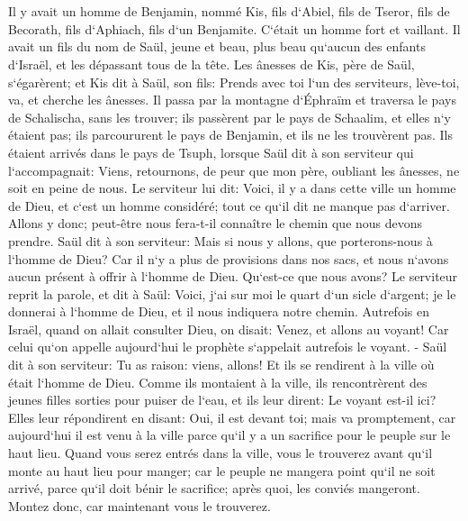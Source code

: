 \chapter{}

\verse Il y avait un homme de Benjamin, nommé Kis, fils d`Abiel, fils de Tseror, fils de Becorath, fils d`Aphiach, fils d`un Benjamite. C`était un homme fort et vaillant. 
\verse Il avait un fils du nom de Saül, jeune et beau, plus beau qu`aucun des enfants d`Israël, et les dépassant tous de la tête. 
\verse Les ânesses de Kis, père de Saül, s`égarèrent; et Kis dit à Saül, son fils: Prends avec toi l`un des serviteurs, lève-toi, va, et cherche les ânesses. 
\verse Il passa par la montagne d`Éphraïm et traversa le pays de Schalischa, sans les trouver; ils passèrent par le pays de Schaalim, et elles n`y étaient pas; ils parcoururent le pays de Benjamin, et ils ne les trouvèrent pas. 
\verse Ils étaient arrivés dans le pays de Tsuph, lorsque Saül dit à son serviteur qui l`accompagnait: Viens, retournons, de peur que mon père, oubliant les ânesses, ne soit en peine de nous. 
\verse Le serviteur lui dit: Voici, il y a dans cette ville un homme de Dieu, et c`est un homme considéré; tout ce qu`il dit ne manque pas d`arriver. Allons y donc; peut-être nous fera-t-il connaître le chemin que nous devons prendre. 
\verse Saül dit à son serviteur: Mais si nous y allons, que porterons-nous à l`homme de Dieu? Car il n`y a plus de provisions dans nos sacs, et nous n`avons aucun présent à offrir à l`homme de Dieu. Qu`est-ce que nous avons? 
\verse Le serviteur reprit la parole, et dit à Saül: Voici, j`ai sur moi le quart d`un sicle d`argent; je le donnerai à l`homme de Dieu, et il nous indiquera notre chemin. 
\verse Autrefois en Israël, quand on allait consulter Dieu, on disait: Venez, et allons au voyant! Car celui qu`on appelle aujourd`hui le prophète s`appelait autrefois le voyant. - 
\verse Saül dit à son serviteur: Tu as raison: viens, allons! Et ils se rendirent à la ville où était l`homme de Dieu. 
\verse Comme ils montaient à la ville, ils rencontrèrent des jeunes filles sorties pour puiser de l`eau, et ils leur dirent: Le voyant est-il ici? 
\verse Elles leur répondirent en disant: Oui, il est devant toi; mais va promptement, car aujourd`hui il est venu à la ville parce qu`il y a un sacrifice pour le peuple sur le haut lieu. 
\verse Quand vous serez entrés dans la ville, vous le trouverez avant qu`il monte au haut lieu pour manger; car le peuple ne mangera point qu`il ne soit arrivé, parce qu`il doit bénir le sacrifice; après quoi, les conviés mangeront. Montez donc, car maintenant vous le trouverez. 
